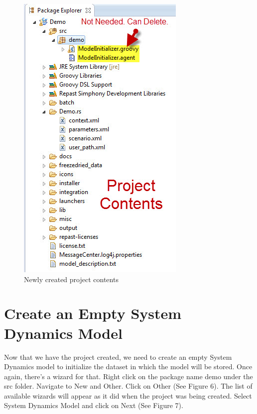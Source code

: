 \documentclass[11pt]{amsart}
\begin{document}
\begin{figure}[ht]
\begin{center}
\vspace{.2in}
\centerline {
\includegraphics[totalheight=0.35\textheight]{images/005.jpg}
}
\caption{Newly created project contents}
\label{fig:005}
\end{center}
\end{figure}

\section{Create an Empty System Dynamics Model}
Now that we have the project created, we need to create an empty System Dynamics model to initialize the dataset in which the model will be stored. Once again, there’s a wizard for that. Right click on the package name demo under the src folder. Navigate to New and Other. Click on Other (See Figure 6). The list of available wizards will appear as it did when the project was being created. Select System Dynamics Model and click on Next (See Figure 7).
\end{document}
